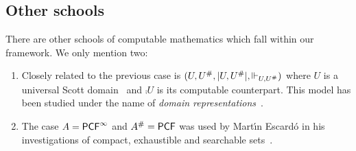 \subsection{Other schools}
\label{sec:other-schools}

There are other schools of computable mathematics which fall within
our framework. We only mention two:
%
\begin{enumerate}
\item
  Closely related to the previous case is $(U, U^{\#}, |U, U^{\#}|, {\Vdash_{U, U^{\#}}})$ where
  $U$ is a universal Scott domain~\cite{GunterScott} and $\comp{U}$ is
  its computable counterpart. This model has been studied under the
  name of \emph{domain representations}~\cite{Bla97,Bla97a}.
\item
  The case $A = \mathsf{PCF}^\infty$ and $A^{\#} = \mathsf{PCF}$ was used by
  Mart{\'\i}n Escard\'o in his investigations of compact, exhaustible
  and searchable sets~\cite{Escardo}.
\end{enumerate}



